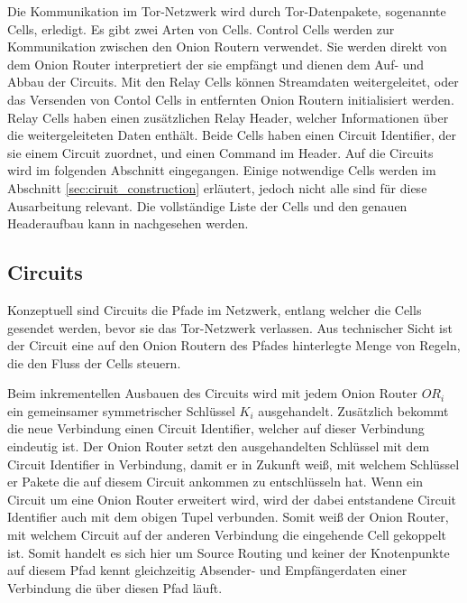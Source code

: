 \documentclass[fleqn,envcountsame,runningheads,10pt,a4paper]{llncs}
\begin{document}
Die Kommunikation im Tor-Netzwerk wird durch Tor-Datenpakete, sogenannte Cells, 
erledigt. Es gibt zwei Arten von Cells. Control Cells werden zur Kommunikation 
zwischen den Onion Routern verwendet. Sie werden direkt von dem Onion Router 
interpretiert der sie empfängt und dienen dem Auf- und Abbau der Circuits. Mit 
den Relay Cells können Streamdaten weitergeleitet, oder das Versenden von Contol 
Cells in entfernten Onion Routern initialisiert werden. Relay Cells haben einen 
zusätzlichen Relay Header, welcher Informationen über die weitergeleiteten Daten 
enthält. Beide Cells haben einen Circuit Identifier, der sie einem Circuit 
zuordnet, und einen Command im Header. Auf die Circuits wird im folgenden 
Abschnitt eingegangen. Einige notwendige Cells werden im Abschnitt 
\ref{sec:ciruit_construction} erläutert, jedoch nicht alle sind für diese 
Ausarbeitung relevant. Die vollständige Liste der Cells und den genauen 
Headeraufbau kann in \cite{tor} nachgesehen werden.

\subsection{Circuits}

Konzeptuell sind Circuits die Pfade im Netzwerk, entlang welcher die Cells gesendet werden, bevor
sie das Tor-Netzwerk verlassen. Aus technischer Sicht ist der Circuit eine auf den Onion Routern
des Pfades hinterlegte Menge von Regeln, die den Fluss der Cells steuern.

Beim inkrementellen Ausbauen des Circuits wird mit jedem Onion Router 
$\textit{OR}_i$ ein gemeinsamer symmetrischer Schlüssel $\textit{K}_i$ 
ausgehandelt. Zusätzlich bekommt die neue Verbindung einen Circuit Identifier, 
welcher auf dieser Verbindung eindeutig ist. Der Onion Router setzt den 
ausgehandelten Schlüssel mit dem Circuit Identifier in Verbindung, damit er in 
Zukunft weiß, mit welchem Schlüssel er Pakete die auf diesem Circuit ankommen zu 
entschlüsseln hat. Wenn ein Circuit um eine Onion Router erweitert wird, wird 
der dabei entstandene Circuit Identifier auch mit dem obigen Tupel 
verbunden. Somit weiß der Onion Router, mit welchem Circuit auf der anderen 
Verbindung die eingehende Cell gekoppelt ist. Somit handelt es sich hier um 
Source Routing und keiner der Knotenpunkte auf diesem Pfad kennt gleichzeitig 
Absender- und Empfängerdaten einer Verbindung die über diesen Pfad läuft. 
\end{document}
